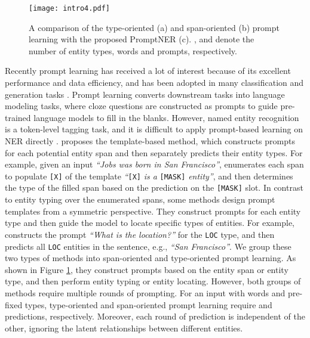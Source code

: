 \documentclass[11pt]{article}
\begin{document}
\begin{figure}[t!]
    \centering
    \texttt{[image: intro4.pdf]}
    \caption{A comparison of the type-oriented (a) and span-oriented (b) prompt learning with the proposed PromptNER (c). ,  and  denote the number of entity types, words and prompts, respectively.}
    \label{fig:comparison}
\end{figure}

Recently prompt learning \citep{https://doi.org/10.48550/arxiv.2107.13586, GPTUnderstand, li-liang-2021-prefix, lester-etal-2021-power} has received a lot of interest because of its excellent performance and data efficiency, and has been adopted in many classification and generation tasks \citep{gao-etal-2021-making, schick-schutze-2021-just, ding2021prompt, wu2022towards}.
Prompt learning converts downstream tasks into language modeling tasks, where cloze questions are constructed as prompts to guide pre-trained language models to fill in the blanks. 
However, named entity recognition is a token-level tagging task, and it is difficult to apply prompt-based learning on NER directly \citep{https://doi.org/10.48550/arxiv.2107.13586}.
\citet{cui-etal-2021-template} proposes the template-based method, which constructs prompts for each potential entity span and then separately predicts their entity types.
For example, given an input \textit{``Jobs was born in San Francisco''}, \citet{cui-etal-2021-template} enumerates each span to populate \texttt{[X]} of the template \textit{``}\texttt{[X]}\textit{ is a }\texttt{[MASK]}\textit{ entity''}, and then determines the type of the filled span based on the prediction on the \texttt{[MASK]} slot.
In contrast to entity typing over the enumerated spans, some methods \citep{li-etal-2020-unified, liu2022qaner} design prompt templates from a symmetric perspective. They construct prompts for each entity type and then guide the model to locate specific types of entities.
For example, \citet{liu2022qaner} constructs the prompt \textit{``What is the location?''} for the \texttt{LOC} type, and then predicts all \texttt{LOC} entities in the sentence, e.g., \textit{``San Francisco''}.
We group these two types of methods into span-oriented and type-oriented prompt learning. As shown in Figure \ref{fig:comparison}, they construct prompts based on the entity span or entity type, and then perform entity typing or entity locating. However, both groups of methods require multiple rounds of prompting. For an input with  words and  pre-fixed types, type-oriented and span-oriented prompt learning require  and  predictions, respectively. Moreover, each round of prediction is independent of the other, ignoring the latent relationships between different entities.
\end{document}
